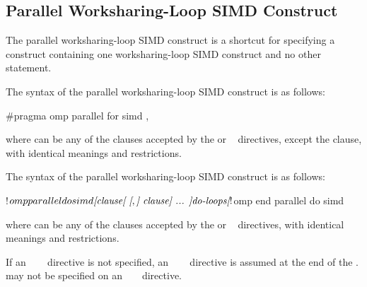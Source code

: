 \subsection{Parallel Worksharing-Loop SIMD Construct}
\label{subsec:Parallel Worksharing-Loop SIMD Construct}
\summary
The parallel worksharing-loop SIMD construct is a shortcut for specifying a  construct
containing one worksharing-loop SIMD construct and no other statement.

\begin{samepage}
\syntax
\begin{ccppspecific}
The syntax of the parallel worksharing-loop SIMD construct is as follows:

\begin{ompcPragma}
#pragma omp parallel for simd \plc{[clause[ [},\plc{] clause] ... ] new-line}
\end{ompcPragma}

where  can be any of the clauses accepted by the 
or ~ directives, except the  clause, with
identical meanings and restrictions.
\end{ccppspecific}
\end{samepage}

\begin{fortranspecific}
\begin{samepage}
The syntax of the parallel worksharing-loop SIMD construct is as follows:

\begin{ompfPragma}
!$omp parallel do simd \plc{[clause[ [},\plc{] clause] ... ]}
    \plc{do-loops}
\plc{[}!$omp end parallel do simd\plc{]}
\end{ompfPragma}
\end{samepage}

where  can be any of the clauses accepted by the 
or ~ directives, with identical meanings and restrictions.

\begin{samepage}
If an ~~~ directive is not specified, an
~~~ directive is assumed at the end of the
.  may not be specified on
an ~ ~ directive.
\end{samepage}
\end{fortranspecific}

